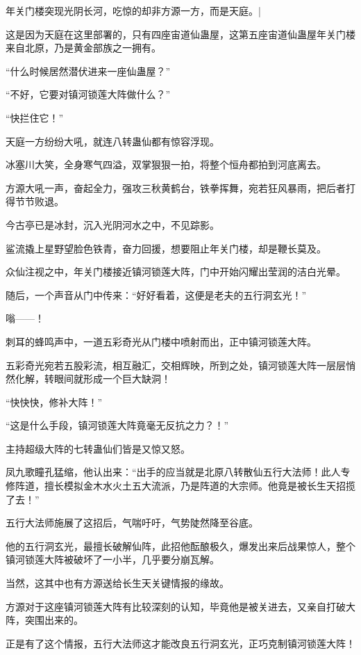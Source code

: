 
\begin{this_body}

年关门楼突现光阴长河，吃惊的却非方源一方，而是天庭。|

这是因为天庭在这里部署的，只有四座宙道仙蛊屋，这第五座宙道仙蛊屋年关门楼来自北原，乃是黄金部族之一拥有。

“什么时候居然潜伏进来一座仙蛊屋？”

“不好，它要对镇河锁莲大阵做什么？”

“快拦住它！”

天庭一方纷纷大吼，就连八转蛊仙都有惊容浮现。

冰塞川大笑，全身寒气四溢，双掌狠狠一拍，将整个恒舟都拍到河底离去。

方源大吼一声，奋起全力，强攻三秋黄鹤台，铁拳挥舞，宛若狂风暴雨，把后者打得节节败退。

今古亭已是冰封，沉入光阴河水之中，不见踪影。

鲨流撬上星野望脸色铁青，奋力回援，想要阻止年关门楼，却是鞭长莫及。

众仙注视之中，年关门楼接近镇河锁莲大阵，门中开始闪耀出莹润的洁白光晕。

随后，一个声音从门中传来：“好好看着，这便是老夫的五行洞玄光！”

嗡——！

刺耳的蜂鸣声中，一道五彩奇光从门楼中喷射而出，正中镇河锁莲大阵。

五彩奇光宛若五股彩流，相互融汇，交相辉映，所到之处，镇河锁莲大阵一层层悄然化解，转眼间就形成一个巨大缺洞！

“快快快，修补大阵！”

“这是什么手段，镇河锁莲大阵竟毫无反抗之力？！”

主持超级大阵的七转蛊仙们皆是又惊又怒。

凤九歌瞳孔猛缩，他认出来：“出手的应当就是北原八转散仙五行大法师！此人专修阵道，擅长模拟金木水火土五大流派，乃是阵道的大宗师。他竟是被长生天招揽了去！”

五行大法师施展了这招后，气喘吁吁，气势陡然降至谷底。

他的五行洞玄光，最擅长破解仙阵，此招他酝酿极久，爆发出来后战果惊人，整个镇河锁莲大阵被破坏了一小半，几乎要分崩瓦解。

当然，这其中也有方源送给长生天关键情报的缘故。

方源对于这座镇河锁莲大阵有比较深刻的认知，毕竟他是被关进去，又亲自打破大阵，突围出来的。

正是有了这个情报，五行大法师这才能改良五行洞玄光，正巧克制镇河锁莲大阵！


\end{this_body}
